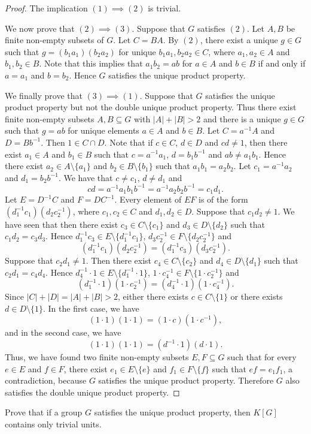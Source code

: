 \begin{graybox}
\begin{proof}
	The implication $(1)\implies(2)$ is trivial.  
	
	We now prove that $(2)\implies(3)$. Suppose that $G$ satisfies $(2)$. Let  $A,B$ be finite non-empty subsets of $G$. Let $C=BA$.  By $(2)$, there exist a unique $g\in G$ such that $g=(b_1a_1)(b_2a_2)$ for unique $b_1a_1,b_2a_2\in C$, where $a_1,a_2\in A$ and $b_1,b_2\in B$. Note that this implies that $a_1b_2=ab$ for $a\in A$ and $b\in B$ if and only if $a=a_1$ and $b=b_2$. Hence $G$ satisfies the unique product property.
	
	We finally prove that $(3)\implies(1)$. Suppose that  $G$ satisfies the unique product property but not the double unique product property. Thus there exist finite non-empty subsets $A,B\subseteq G$ with $|A|+|B|>2$ and there is a unique $g\in G$ such that $g=ab$ for unique elements $a\in A$ and $b\in B$.
	Let $C=a^{-1}A$ and $D=Bb^{-1}$. Then $1\in C\cap D$. Note that if $c\in C$, $d\in D$ and $cd\neq 1$, then there exist $a_1\in A$ and $b_1\in B$ such that $c=a^{-1}a_1$, $d=b_1b^{-1}$ and $ab\neq a_1b_1$. Hence there exist $a_2\in A\setminus\{ a_1\}$ and $b_2\in B\setminus\{ b_1\}$ such that $a_1b_1=a_2b_2$. Let $c_1=a^{-1}a_2$ and $d_1=b_2b^{-1}$. We have that $c\neq c_1$, $d\neq d_1$ and 
	\[ cd=a^{-1}a_1b_1b^{-1}=a^{-1}a_2b_2b^{-1}=c_1d_1.\]
	Let $E=D^{-1}C$ and $F=DC^{-1}$. Every element of $EF$ is of the form $(d_1^{-1}c_1)(d_2c_2^{-1})$, where $c_1,c_2\in C$ and $d_1,d_2\in D$. Suppose that $c_1d_2\ne 1$. We have seen that then there exist $c_3\in C\setminus \{ c_1\}$ and $d_3\in D\setminus\{ d_2\}$ such that $c_1d_2=c_3d_3$. Hence $d_1^{-1}c_3\in E\setminus \{ d_1^{-1}c_1\}$, $d_3c_2^{-1}\in F\setminus\{ d_2c_2^{-1}\}$
	and
	\[ (d_1^{-1}c_1)(d_2c_2^{-1})=(d_1^{-1}c_3)(d_3c_2^{-1}).\]
	Suppose that $c_2d_1\neq 1$. Then there exist $c_4\in C\setminus \{ c_2\}$ and $d_4\in D\setminus\{ d_1\}$ such that $c_2d_1=c_4d_4$. Hence $d_4^{-1}\cdot 1\in E\setminus \{ d_1^{-1}\cdot 1\}$, $1\cdot c_4^{-1}\in F\setminus\{ 1\cdot c_2^{-1}\}$
	and
	\[ (d_1^{-1}\cdot 1)(1\cdot c_2^{-1})=(d_4^{-1}\cdot 1)(1\cdot c_4^{-1}).\]
	Since $|C|+|D|=|A|+|B|>2$, either there exists $c\in C\setminus\{ 1\}$ or there exists $d\in D\setminus\{ 1\}$. In the first case, we have
	\[ (1\cdot 1)(1\cdot 1)=(1\cdot c)(1\cdot c^{-1}),\]
	and in the second case, we have 
		\[ (1\cdot 1)(1\cdot 1)=(d^{-1} \cdot 1)(d\cdot 1).\]
	Thus, we have found two finite non-empty subsets $E,F\subseteq G$ such that for every $e\in E$ and $f\in F$, there exist $e_1\in E\setminus\{ e\}$ and $f_1\in F\setminus\{ f\}$ such that
	$ef=e_1f_1$, a contradiction, because $G$ satisfies the unique product property. Therefore $G$ also satisfies the double unique product property.
\end{proof}

\begin{xca}
	Prove that if a group $G$ satisfies the unique product property, then 
    $K[G]$ contains only trivial units.
\end{xca}
\end{graybox}

